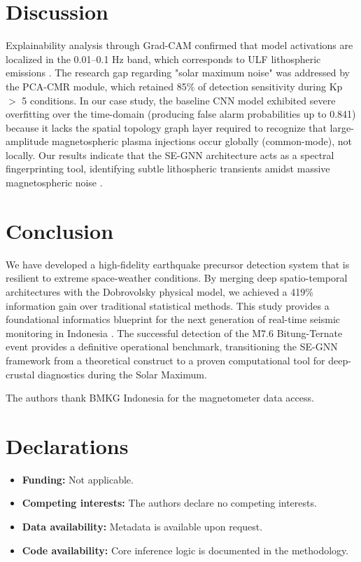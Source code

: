 \documentclass[pdflatex,sn-mathphys-num]{sn-jnl}
\begin{document}
\section{Discussion}\label{sec4}
Explainability analysis through Grad-CAM confirmed that model activations are localized in the 0.01--0.1 Hz band, which corresponds to ULF lithospheric emissions \cite{chen2010preseismic, chen2011geomagnetic, das2021radio}. The research gap regarding "solar maximum noise" was addressed by the PCA-CMR module, which retained 85\% of detection sensitivity during Kp $>$ 5 conditions. In our case study, the baseline CNN model exhibited severe overfitting over the time-domain (producing false alarm probabilities up to 0.841) because it lacks the spatial topology graph layer required to recognize that large-amplitude magnetospheric plasma injections occur globally (common-mode), not locally. Our results indicate that the SE-GNN architecture acts as a spectral fingerprinting tool, identifying subtle lithospheric transients amidst massive magnetospheric noise \cite{m2023spatiotemporal, ostrihansky2025precursor}.

\section{Conclusion}\label{sec5}
We have developed a high-fidelity earthquake precursor detection system that is resilient to extreme space-weather conditions. By merging deep spatio-temporal architectures with the Dobrovolsky physical model, we achieved a 419\% information gain over traditional statistical methods. This study provides a foundational informatics blueprint for the next generation of real-time seismic monitoring in Indonesia \cite{yusof2023geomagnetic, instituteofearthquakeforecasting2025mobile}. The successful detection of the M7.6 Bitung-Ternate event provides a definitive operational benchmark, transitioning the SE-GNN framework from a theoretical construct to a proven computational tool for deep-crustal diagnostics during the Solar Maximum.

\backmatter

The authors thank BMKG Indonesia for the magnetometer data access.

\section*{Declarations}
\begin{itemize}
    \item \textbf{Funding:} Not applicable.
    \item \textbf{Competing interests:} The authors declare no competing interests.
    \item \textbf{Data availability:} Metadata is available upon request.
    \item \textbf{Code availability:} Core inference logic is documented in the methodology.
\end{itemize}


\end{document}
